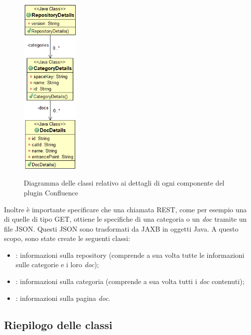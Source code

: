 \begin{figure}[H]
    \centering
    \includegraphics[width=0.25\textwidth]{immagini/details.png}\\
    \caption{Diagramma delle classi relativo ai dettagli di ogni componente del plugin Confluence}
\end{figure}

Inoltre è importante specificare che una chiamata REST, come per esempio una di quelle di tipo GET, ottiene le specifiche di una categoria o un \emph{doc} tramite un file JSON.
Questi JSON sono trasformati da JAXB in oggetti Java.
A questo scopo, sono state create le seguenti classi:
\begin{itemize}
    \item {}: informazioni sulla repository (comprende a sua volta tutte le informazioni sulle categorie e i loro \emph{doc});
    \item {}: informazioni sulla categoria (comprende a sua volta tutti i \emph{doc} contenuti);
    \item {}: informazioni sulla pagina \emph{doc}.
\end{itemize}



    \subsection{Riepilogo delle classi}

